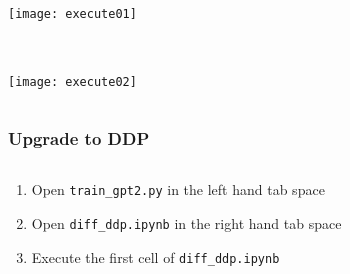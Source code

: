 \documentclass[
	notes=none,
	aspectratio=169
]{beamer}
\begin{document}
\begin{frame}
\frametitle{}

\begin{columns}[T]
\begin{column}[T]{1.0\textwidth}
\setlength{\parskip}{0.5em}

\vspace{0.0cm}
\texttt{[image: execute01]}


\end{column}
\end{columns}

\end{frame}
\note{
}


\begin{frame}
\frametitle{}

\begin{columns}[T]
\begin{column}[T]{1.0\textwidth}
\setlength{\parskip}{0.5em}

\vspace{0.0cm}
\texttt{[image: execute02]}


\end{column}
\end{columns}

\end{frame}
\note{
}


\begin{frame}
\frametitle{Upgrade to DDP}

\begin{columns}[T]
\begin{column}[T]{1.0\textwidth}
\setlength{\parskip}{0.5em}

\vspace{0.0cm}
\begin{enumerate}
\setlength{\parskip}{0.5em}
\item Open {\tt train\_gpt2.py} in the left hand tab space
\item Open {\tt diff\_ddp.ipynb} in the right hand tab space
\item Execute the first cell of {\tt diff\_ddp.ipynb}
\end{enumerate}

\end{column}
\end{columns}

\end{frame}
\note{
}
\end{document}
